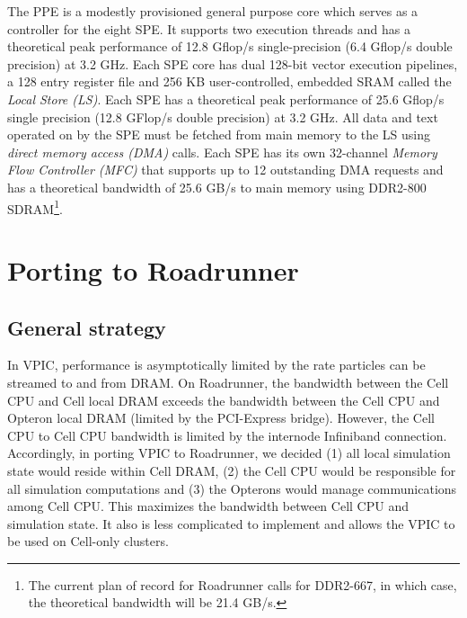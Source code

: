 \documentclass[letter,10pt]{article}
\begin{document}
The PPE is a modestly provisioned general purpose core
which serves as a controller for the eight
SPE.  It supports two execution threads and has a theoretical peak
performance of 12.8 Gflop/s single-precision (6.4 Gflop/s double
precision) at 3.2 GHz.  Each SPE core has dual 128-bit vector execution
pipelines, a 128 entry register file and 256 KB user-controlled, embedded
SRAM called the \emph{Local Store (LS)}.  Each SPE has a theoretical
peak performance of 25.6 Gflop/s single precision (12.8 GFlop/s
double precision) at 3.2 GHz.  All data and text operated on by
the SPE must be fetched from main memory to the LS using \emph{direct
memory access (DMA)} calls.  Each SPE has its own 32-channel
\emph{Memory Flow Controller (MFC)} that supports up to 12 outstanding
DMA requests and has a theoretical bandwidth of 25.6 GB/s to main
memory using DDR2-800 SDRAM\footnote{The current plan of record for
Roadrunner calls for DDR2-667, in which case, the theoretical
bandwidth will be 21.4 GB/s.}.



\section{Porting to Roadrunner}

\subsection{General strategy}

In VPIC, performance is asymptotically limited by the rate particles
can be streamed to and from DRAM.  On Roadrunner, the bandwidth
between the Cell CPU and Cell local DRAM exceeds the bandwidth between
the Cell CPU and Opteron local DRAM (limited by the PCI-Express
bridge).  However, the Cell CPU to Cell CPU bandwidth is limited by
the internode Infiniband connection.  Accordingly, in porting VPIC to
Roadrunner, we decided (1) all local simulation state would reside
within Cell DRAM, (2) the Cell CPU would be responsible for all
simulation computations and (3) the Opterons would manage
communications among Cell CPU.  This maximizes the bandwidth
between Cell CPU and simulation state.  It also is less complicated
to implement and allows the VPIC to be used on Cell-only clusters.
\end{document}
